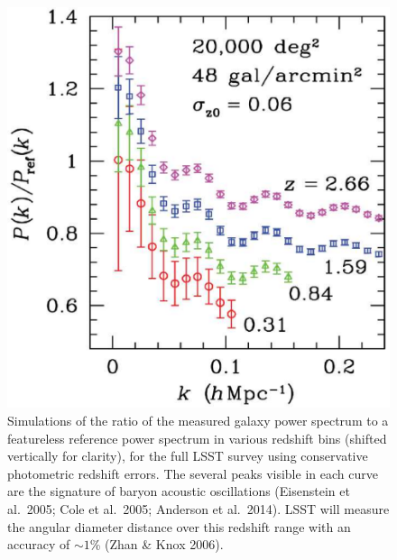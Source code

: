 \begin{figure}
\includegraphics[width=1.0\hsize,clip]{bao.pdf}
\caption{Simulations of the ratio of the measured galaxy power spectrum to
a featureless reference power spectrum in various redshift bins (shifted vertically
for clarity), for the full LSST survey using conservative photometric redshift
errors. The several peaks visible in each curve are the signature of baryon acoustic
oscillations (Eisenstein et al.~2005; Cole et al.~2005; Anderson et al.~2014). LSST will measure the
angular diameter distance over this redshift range with an accuracy of $\sim1$\%
(Zhan \& Knox 2006).}
\label{Fig:bao}
\end{figure}



